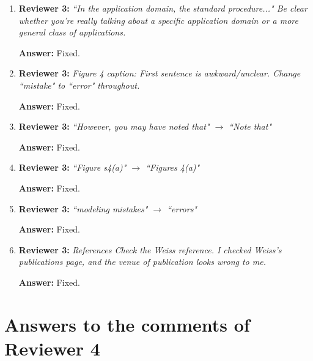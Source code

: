\documentclass[letterpaper]{article}
\begin{document}
\begin{enumerate}
\item \textbf{Reviewer 3:} \emph{ ``In the application domain, the standard procedure..." Be clear whether you're really talking about a specific application domain or a more general class of applications.}

\textbf{Answer:} Fixed.

\item \textbf{Reviewer 3:} \emph{ Figure 4 caption: First sentence is awkward/unclear.  Change ``mistake" to ``error" throughout.}

\textbf{Answer:} Fixed.

\item \textbf{Reviewer 3:} \emph{ ``However, you may have noted that" $\rightarrow$ ``Note that"}

\textbf{Answer:} Fixed.

\item \textbf{Reviewer 3:} \emph{ ``Figure s4(a)" $\rightarrow$ ``Figures 4(a)"}

\textbf{Answer:} Fixed.

\item \textbf{Reviewer 3:} \emph{ ``modeling mistakes" $\rightarrow$ ``errors"}

\textbf{Answer:} Fixed.

\item \textbf{Reviewer 3:} \emph{ References Check the Weiss reference.  I checked Weiss's publications page, and the venue of publication looks wrong to me. }

\textbf{Answer:} Fixed.

\end{enumerate}


\section{Answers to the comments of Reviewer 4} \label{sec:reviewer4}
\end{document}
